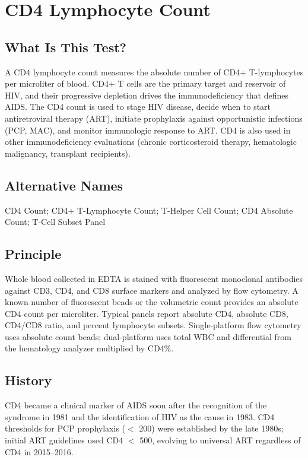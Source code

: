 \chapter{CD4 Lymphocyte Count}

\section*{What Is This Test?}
A CD4 lymphocyte count measures the absolute number of CD4+ T-lymphocytes per microliter of blood. CD4+ T cells are the primary target and reservoir of HIV, and their progressive depletion drives the immunodeficiency that defines AIDS. The CD4 count is used to stage HIV disease, decide when to start antiretroviral therapy (ART), initiate prophylaxis against opportunistic infections (PCP, MAC), and monitor immunologic response to ART. CD4 is also used in other immunodeficiency evaluations (chronic corticosteroid therapy, hematologic malignancy, transplant recipients).

\section*{Alternative Names}
CD4 Count; CD4+ T-Lymphocyte Count; T-Helper Cell Count; CD4 Absolute Count; T-Cell Subset Panel

\section*{Principle}
Whole blood collected in EDTA is stained with fluorescent monoclonal antibodies against CD3, CD4, and CD8 surface markers and analyzed by flow cytometry. A known number of fluorescent beads or the volumetric count provides an absolute CD4 count per microliter. Typical panels report absolute CD4, absolute CD8, CD4/CD8 ratio, and percent lymphocyte subsets. Single-platform flow cytometry uses absolute count beads; dual-platform uses total WBC and differential from the hematology analyzer multiplied by CD4\%.

\section*{History}
CD4 became a clinical marker of AIDS soon after the recognition of the syndrome in 1981 and the identification of HIV as the cause in 1983. CD4 thresholds for PCP prophylaxis ($<$ 200) were established by the late 1980s; initial ART guidelines used CD4 $<$ 500, evolving to universal ART regardless of CD4 in 2015--2016.

